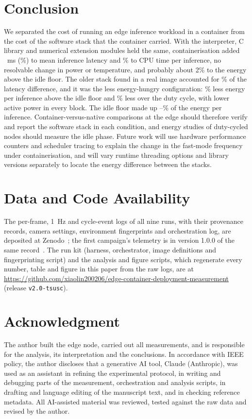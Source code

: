 \documentclass[10pt,journal,compsoc]{IEEEtran}
\begin{document}
\section{Conclusion}\label{sec:conclusion}
We separated the cost of running an edge inference workload in a container from the cost of the software stack that the container carried. With the interpreter, C library and numerical extension modules held the same, containerisation added \LatMeanBAabs~ms (\LatMeanBApctabs\%) to mean inference latency and \CPUmsBApctabs\% to CPU time per inference, no resolvable change in power or temperature, and probably about 2\% to the energy above the idle floor. The older stack found in a real image accounted for \ShareStack\% of the latency difference, and it was the less energy-hungry configuration: \EIncCBpctabs\% less energy per inference above the idle floor and \ECycCBpctabs\% less over the duty cycle, with lower active power in every block. The idle floor made up \EBaseShareLo--\EBaseShareHi\% of the energy per inference. Container-versus-native comparisons at the edge should therefore verify and report the software stack in each condition, and energy studies of duty-cycled nodes should measure the idle phase. Future work will use hardware performance counters and scheduler tracing to explain the change in the fast-mode frequency under containerisation, and will vary runtime threading options and library versions separately to locate the energy difference between the stacks.

\section*{Data and Code Availability}
The per-frame, 1~Hz and cycle-event logs of all nine runs, with their provenance records, camera settings, environment fingerprints and orchestration log, are deposited at Zenodo~\cite{lin2026datasetv2}; the first campaign's telemetry is in version 1.0.0 of the same record~\cite{lin2026datasetv1}. The run kit (harness, orchestrator, image definitions and fingerprinting script) and the analysis and figure scripts, which regenerate every number, table and figure in this paper from the raw logs, are at \url{https://github.com/xiaolin200206/edge-container-deployment-measurement} (release \texttt{v2.0-tsusc}).

\section*{Acknowledgment}
The author built the edge node, carried out all measurements, and is responsible for the analysis, its interpretation and the conclusions. In accordance with IEEE policy, the author discloses that a generative AI tool, Claude (Anthropic), was used as an assistant in refining the experimental protocol, in writing and debugging parts of the measurement, orchestration and analysis scripts, in drafting and language editing of the manuscript text, and in checking reference metadata. All AI-assisted material was reviewed, tested against the raw data and revised by the author.
\end{document}
